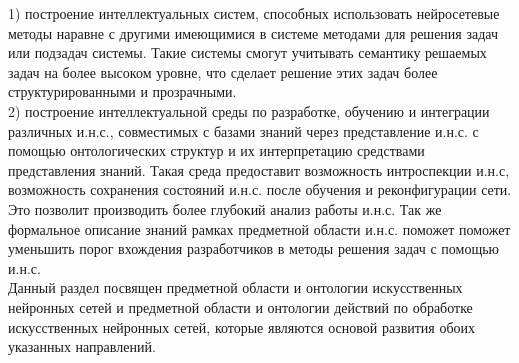 \begin{SCn}
\begin{scnsubstruct}
{1) построение интеллектуальных систем, способных использовать нейросетевые методы наравне с другими имеющимися в системе методами для решения задач или подзадач системы. Такие системы смогут учитывать семантику решаемых задач на более высоком уровне, что сделает решение этих задач более структурированными и прозрачными.\\
2) построение интеллектуальной среды по разработке, обучению и интеграции различных и.н.с., совместимых с базами знаний через представление и.н.с. с помощью онтологических структур и их интерпретацию средствами представления знаний. Такая среда предоставит возможность интроспекции и.н.с, возможность сохранения состояний и.н.с. после обучения и реконфигурации сети. Это позволит производить более глубокий анализ работы и.н.с. Так же формальное описание знаний рамках предметной области и.н.с. поможет поможет уменьшить порог вхождения разработчиков в методы решения задач с помощью и.н.с.\\
Данный раздел посвящен предметной области и онтологии искусственных нейронных сетей и предметной области и онтологии действий по обработке искусственных нейронных сетей, которые являются основой развития обоих указанных направлений.
}

\begin{scnsubstruct}



\end{scnsubstruct}
\end{scnsubstruct}
\end{SCn}
